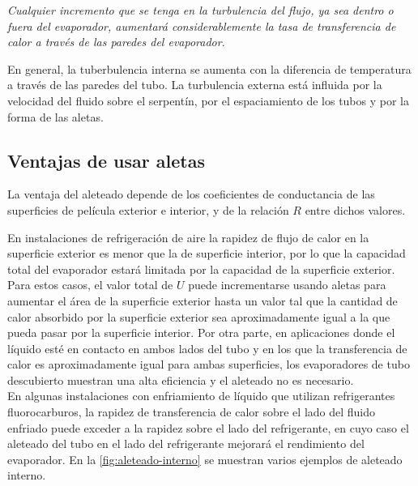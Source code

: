 				
				\emph{Cualquier incremento que se tenga en la turbulencia del flujo, ya sea dentro o fuera del evaporador, aumentará considerablemente la tasa de transferencia de calor a través de las paredes del evaporador}. 
				
				En general, la tuberbulencia interna se aumenta con la diferencia de temperatura a través de las paredes del tubo. La turbulencia externa está influida por la velocidad del fluido sobre el serpentín, por el espaciamiento de los tubos y por la forma de las aletas.\\
				
			\subsection{Ventajas de usar aletas}
				
				La ventaja del aleteado depende de los coeficientes de conductancia de las superficies de película exterior e interior, y de la relación $R$ entre dichos valores. 
				
				
				En instalaciones de refrigeración de aire la rapidez de flujo de calor en la superficie exterior es menor que la de superficie interior, por lo que la capacidad total del evaporador estará limitada por la capacidad de la superficie exterior. Para estos casos, el valor total de $U$ puede incrementarse usando aletas para aumentar el área de la superficie exterior hasta un valor tal que la cantidad de calor absorbido por la superficie exterior sea aproximadamente igual a la que pueda pasar por la superficie interior. Por otra parte, en aplicaciones donde el líquido esté en contacto en ambos lados del tubo y en los que la transferencia de calor es aproximadamente igual para ambas superficies, los evaporadores de tubo descubierto muestran una alta eficiencia y el aleteado no es necesario.	\\
		
				En algunas instalaciones con enfriamiento de líquido que utilizan refrigerantes fluorocarburos, la rapidez de transferencia de calor sobre el lado del fluido enfriado puede exceder a la rapidez sobre el lado del refrigerante, en cuyo caso el aleteado del tubo en el lado del refrigerante mejorará el rendimiento del evaporador. En la \autoref{fig:aleteado-interno} se muestran varios ejemplos de aleteado interno.
			
